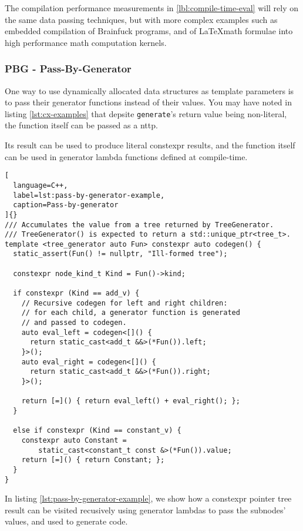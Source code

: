 \documentclass[../main]{subfiles}
\begin{document}
The compilation performance measurements in \ref{lbl:compile-time-eval} will
rely on the same data passing techniques, but with more complex examples such
as embedded compilation of Brainfuck programs, and of \LaTeX math formulae
into high performance math computation kernels.

\subsubsection{
  PBG - Pass-By-Generator
}

\label{lbl:pbg-technique}

One way to use dynamically allocated data structures as template parameters
is to pass their generator functions instead of their values.
You may have noted in listing \ref{lst:cx-examples} that depsite
\lstinline{generate}'s return value being non-literal, the function itself
can be passed as a \gls{nttp}.

Its result can be used to produce literal \gls{constexpr} results,
and the function itself can be used in generator lambda functions
defined at compile-time.

\begin{lstlisting}[
  language=C++,
  label=lst:pass-by-generator-example,
  caption=Pass-by-generator
]{}
/// Accumulates the value from a tree returned by TreeGenerator.
/// TreeGenerator() is expected to return a std::unique_ptr<tree_t>.
template <tree_generator auto Fun> constexpr auto codegen() {
  static_assert(Fun() != nullptr, "Ill-formed tree");

  constexpr node_kind_t Kind = Fun()->kind;

  if constexpr (Kind == add_v) {
    // Recursive codegen for left and right children:
    // for each child, a generator function is generated
    // and passed to codegen.
    auto eval_left = codegen<[]() {
      return static_cast<add_t &&>(*Fun()).left;
    }>();
    auto eval_right = codegen<[]() {
      return static_cast<add_t &&>(*Fun()).right;
    }>();

    return [=]() { return eval_left() + eval_right(); };
  }

  else if constexpr (Kind == constant_v) {
    constexpr auto Constant =
        static_cast<constant_t const &>(*Fun()).value;
    return [=]() { return Constant; };
  }
}
\end{lstlisting}

In listing \ref{lst:pass-by-generator-example}, we show how a \gls{constexpr}
pointer tree result can be visited recusively using generator lambdas
to pass the subnodes' values, and used to generate code.
\end{document}
